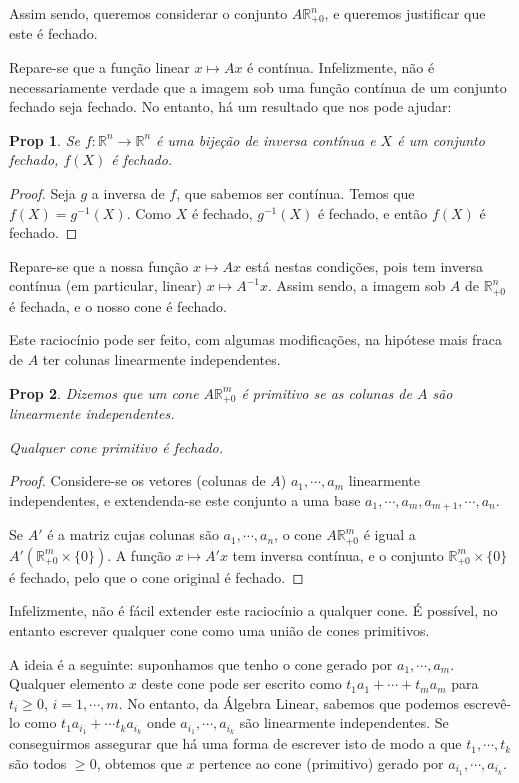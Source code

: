 \documentclass{article}
\newcommand{\R}{\mathbb{R}}
\newtheorem{prop}{Prop}
\theoremstyle{definition}
\begin{document}
	Assim sendo, queremos considerar o conjunto $A \R^n_{+0}$, e queremos justificar que este é fechado.
	
	Repare-se que a função linear $x \mapsto Ax$ é contínua. Infelizmente, não é necessariamente verdade que a imagem sob uma função contínua de um conjunto fechado seja fechado. No entanto, há um resultado que nos pode ajudar:
	
	\begin{prop}
	Se $f : \R^n \rightarrow \R^n$ é uma bijeção de inversa contínua e $X$ é um conjunto fechado, $f(X)$ é fechado.
	\end{prop}
	
	\begin{proof}
	Seja $g$ a inversa de $f$, que sabemos ser contínua. Temos que $f(X) = g^{-1}(X)$. Como $X$ é fechado, $g^{-1}(X)$ é fechado, e então $f(X)$ é fechado.
	\end{proof}
	
	Repare-se que a nossa função $x \mapsto Ax$ está nestas condições, pois tem inversa contínua (em particular, linear) $x \mapsto A^{-1} x$. Assim sendo, a imagem sob $A$ de $\R^n_{+0}$ é fechada, e o nosso cone é fechado.
	
	Este raciocínio pode ser feito, com algumas modificações, na hipótese mais fraca de $A$ ter colunas linearmente independentes.
	
	\begin{prop}
	Dizemos que um cone $A \R^m_{+0}$ é \emph{primitivo} se as colunas de $A$ são linearmente independentes.
	
	Qualquer cone primitivo é fechado.
	\end{prop}
	
	\begin{proof}
	Considere-se os vetores (colunas de $A$) $a_1, \cdots, a_m$ linearmente independentes, e extendenda-se este conjunto a uma base $a_1, \cdots, a_m, a_{m+1}, \cdots, a_n$.
	
	Se $A'$ é a matriz cujas colunas são $a_1, \cdots, a_n$, o cone $A \R^m_{+0}$ é igual a \allowbreak ${A' (\R^m_{+0} \times \{0\})}$. A função $x \mapsto A'x$ tem inversa contínua, e o conjunto $\R^m_{+0} \times \{0\}$ é fechado, pelo que o cone original é fechado.
	\end{proof}
	
	Infelizmente, não é fácil extender este raciocínio a qualquer cone. É possível, no entanto escrever qualquer cone como uma união de cones primitivos.
	
	A ideia é a seguinte: suponhamos que tenho o cone gerado por $a_1, \cdots, a_m$. Qualquer elemento $x$ deste cone pode ser escrito como $t_1 a_1 + \cdots + t_m a_m$ para $t_i \geq 0$, $i = 1, \cdots, m$. No entanto, da Álgebra Linear, sabemos que podemos escrevê-lo como $t_1 a_{i_1} + \cdots t_k a_{i_k}$ onde $a_{i_1}, \cdots, a_{i_k}$ são linearmente independentes. Se conseguirmos assegurar que há uma forma de escrever isto de modo a que $t_1, \cdots, t_k$ são todos $\geq 0$, obtemos que $x$ pertence ao cone (primitivo) gerado por $a_{i_1}, \cdots, a_{i_k}$.
	
\end{document}
